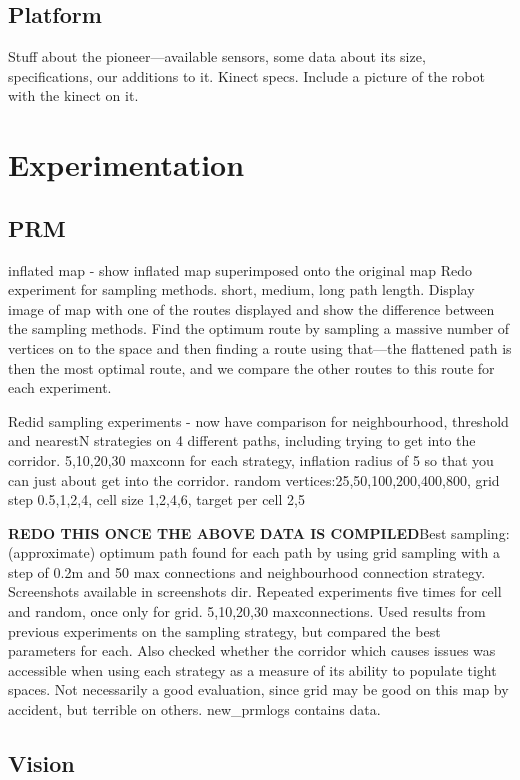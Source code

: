 \documentclass[conference]{IEEEtran}
\begin{document}
\subsection{Platform}
Stuff about the pioneer---available sensors, some data about its size, specifications, our additions to it. Kinect specs. Include a picture of the robot with the kinect on it. 
\section{Experimentation}
\subsection{PRM}
inflated map - show inflated map superimposed onto the original map
Redo experiment for sampling methods. short, medium, long path length. Display image of map with one of the routes displayed and show the difference between the sampling methods. Find the optimum route by sampling a massive number of vertices on to the space and then finding a route using that---the flattened path is then the most optimal route, and we compare the other routes to this route for each experiment.

Redid sampling experiments - now have comparison for neighbourhood, threshold and nearestN strategies on 4 different paths, including trying to get into the corridor. 5,10,20,30 maxconn for each strategy, inflation radius of 5 so that you can just about get into the corridor. random vertices:25,50,100,200,400,800, grid step 0.5,1,2,4, cell size 1,2,4,6, target per cell 2,5

\textbf{REDO THIS ONCE THE ABOVE DATA IS COMPILED}Best sampling: (approximate) optimum path found for each path by using grid sampling with a step of 0.2m and 50 max connections and neighbourhood connection strategy. Screenshots available in screenshots dir. Repeated experiments five times for cell and random, once only for grid. 5,10,20,30 maxconnections. Used results from previous experiments on the sampling strategy, but compared the best parameters for each. Also checked whether the corridor which causes issues was accessible when using each strategy as a measure of its ability to populate tight spaces. Not necessarily a good evaluation, since grid may be good on this map by accident, but terrible on others. new_prmlogs contains data.


\subsection{Vision}
\end{document}
